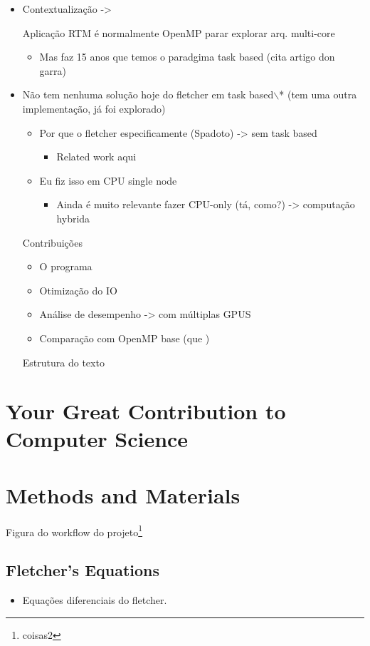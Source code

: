 \documentclass[12pt]{article}
\begin{document}
\begin{itemize}
\item Contextualização ->

Aplicação RTM é normalmente OpenMP parar explorar arq. multi-core
\begin{itemize}
\item Mas faz 15 anos que temos o paradgima task based (cita artigo don garra)
\end{itemize}

\item Não tem nenhuma solução hoje do fletcher em task based$\backslash$*  (tem uma outra implementação, já foi explorado)
\begin{itemize}
\item Por que o fletcher especificamente (Spadoto) -> sem task based
\begin{itemize}
\item Related work aqui
\end{itemize}
\item Eu fiz isso em CPU single node 
\begin{itemize}
\item Ainda é muito relevante fazer CPU-only (tá, como?) -> computação hybrida
\end{itemize}
\end{itemize}

Contribuições
\begin{itemize}
\item O programa
\item Otimização do IO
\item Análise de desempenho -> com múltiplas GPUS
\item Comparação com OpenMP base (que )
\end{itemize}

Estrutura do texto
\end{itemize}
\section{Your Great Contribution to Computer Science}
\label{sec:org85fd14b}
\label{org0eef2d5}
\section{Methods and Materials}
\label{sec:orgb22a0ba}

Figura do workflow do projeto\footnote{coisas2}
\subsection{Fletcher's Equations}
\label{sec:org95bd2dd}
\begin{itemize}
\item Equações diferenciais do fletcher.
\end{itemize}
\end{document}
